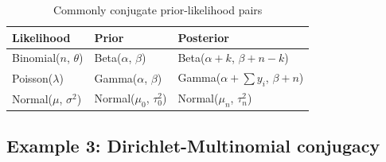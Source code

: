 \begin{table}[htbp]
\centering
\caption{Commonly conjugate prior-likelihood pairs}
\begin{tabular}{lll}
\toprule
\textbf{Likelihood} & \textbf{Prior} & \textbf{Posterior} \\
\midrule
Binomial($n$, $\theta$) & Beta($\alpha$, $\beta$) & Beta($\alpha + k$, $\beta + n - k$) \\
Poisson($\lambda$) & Gamma($\alpha$, $\beta$) & Gamma($\alpha + \sum y_i$, $\beta + n$) \\
Normal($\mu$, $\sigma^2$) & Normal($\mu_0$, $\tau_0^2$) & Normal($\mu_n$, $\tau_n^2$) \\
\bottomrule
\end{tabular}
\end{table}

\subsection{Example 3: Dirichlet-Multinomial conjugacy}
